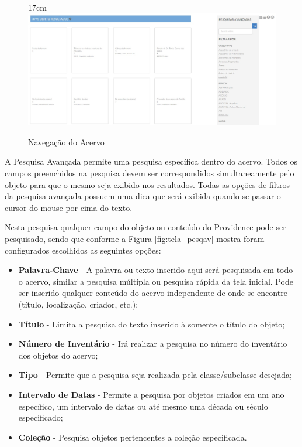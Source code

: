 \documentclass[a4paper,12pt,oneside,onecolumn,final,fleqn]{repUERJ}
\begin{document}
\begin{figure}[!ht]{17cm}
	\includegraphics[width=15cm, center]{figuras/pawtucket_navegarobjetos.jpg}
	\caption{Navegação do Acervo} \label{fig:tela_navobj}
\end{figure}

A Pesquisa Avançada permite uma pesquisa específica dentro do acervo. Todos os campos preenchidos na pesquisa devem ser correspondidos simultaneamente pelo objeto para que o mesmo seja exibido nos resultados. Todas as opções de filtros da pesquisa avançada possuem uma dica que será exibida quando se passar o cursor do mouse por cima do texto.

Nesta pesquisa qualquer campo do objeto ou conteúdo do Providence pode ser pesquisado, sendo que conforme a Figura \ref{fig:tela_pesqav} mostra foram configurados escolhidos as seguintes opções:

\begin{itemize}
	\item \textbf{Palavra-Chave} - A palavra ou texto inserido aqui será pesquisada em todo o acervo, similar a pesquisa múltipla ou pesquisa rápida da tela inicial. Pode ser inserido qualquer conteúdo do acervo independente de onde se encontre (título, localização, criador, etc.);
	\item \textbf{Título} - Limita a pesquisa do texto inserido à somente o título do objeto;
	\item \textbf{Número de Inventário} - Irá realizar a pesquisa no número do inventário dos objetos do acervo;
	\item \textbf{Tipo} - Permite que a pesquisa seja realizada pela classe/subclasse desejada;
	\item \textbf{Intervalo de Datas} - Permite a pesquisa por objetos criados em um ano específico, um intervalo de datas ou até mesmo uma década ou século especificado;
	\item \textbf{Coleção} - Pesquisa objetos pertencentes a coleção especificada.
\end{itemize}
\end{document}

